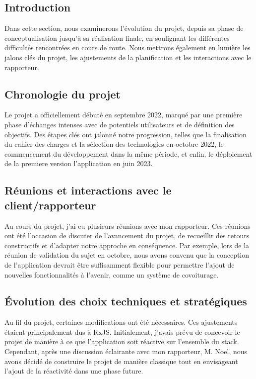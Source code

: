\subsection{Introduction}\label{subsec:introduction2}
Dans cette section, nous examinerons l'évolution du projet, depuis sa phase de conceptualisation jusqu'à sa réalisation finale, en soulignant les différentes difficultés rencontrées en cours de route.
Nous mettrons également en lumière les jalons clés du projet, les ajustements de la planification et les interactions avec le rapporteur.

\subsection{Chronologie du projet}\label{subsec:chronologie-du-projet}
Le projet a officiellement débuté en septembre 2022, marqué par une première phase d'échanges intenses avec de potentiels utilisateurs et de définition des objectifs.
Des étapes clés ont jalonné notre progression, telles que la finalisation du cahier des charges et la sélection des technologies en octobre 2022,
le commencement du développement dans la même période, et enfin, le déploiement de la premiere version l'application en juin 2023.

\subsection{Réunions et interactions avec le client/rapporteur}\label{subsec:reunions-et-interactions-avec-le-client/rapporteur}
Au cours du projet, j'ai eu plusieurs réunions avec mon rapporteur.
Ces réunions ont été l'occasion de discuter de l'avancement du projet, de recueillir des retours constructifs et d'adapter notre approche en conséquence.
Par exemple, lors de la réunion de validation du sujet en octobre, nous avons convenu que la conception de l'application
devrait être suffisamment flexible pour permettre l'ajout de nouvelles fonctionnalités à l'avenir, comme un système de covoiturage.

\subsection{Évolution des choix techniques et stratégiques}\label{subsec:evolution-des-choix-techniques-et-strategiques}
Au fil du projet, certaines modifications ont été nécessaires.
Ces ajustements étaient principalement dus à RxJS. Initialement, j'avais prévu de concevoir le projet de manière à ce que l'application soit réactive sur l'ensemble du stack.
Cependant, après une discussion éclairante avec mon rapporteur, M. Noel,
nous avons décidé de construire le projet de manière classique tout en envisageant l'ajout de la réactivité dans une phase future.

